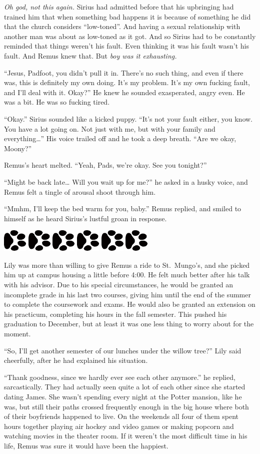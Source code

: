\documentclass[12pt,twoside,openright]{memoir}
\newcommand{\dogPrintRule}{	
	\begin{center}
		\hspace{.5em}
		\includegraphics[angle=60]{dogprint.pdf}
		\hspace{.5em}
		\includegraphics[angle=120]{dogprint.pdf}
		\hspace{.5em}
		\includegraphics[angle=60]{dogprint.pdf}
		\hspace{.5em}
		\includegraphics[angle=120]{dogprint.pdf}
		\hspace{.5em}
		\includegraphics[angle=60]{dogprint.pdf}
		\hspace{.5em}
		\includegraphics[angle=120]{dogprint.pdf}
		\hspace{.5em}
	\end{center}
}
\begin{document}
\textit{Oh god, not this again.} Sirius had admitted before that his upbringing had trained him that when something bad happens it is because of something he did that the church considers ``low-toned''. And having a sexual relationship with another man was about as low-toned as it got. And so Sirius had to be constantly reminded that things weren't his fault. Even thinking it was his fault wasn't his fault. And Remus knew that. But \textit{boy was it exhausting.}

``Jesus, Padfoot, you didn't pull it in. There's no such thing, and even if there was, this is definitely my own doing. It's my problem. It's my own fucking fault, and I'll deal with it. Okay?'' He knew he sounded exasperated, angry even. He was a bit. He was so fucking tired.

``Okay.'' Sirius sounded like a kicked puppy. ``It's not your fault either, you know. You have a lot going on. Not just with me, but with your family and everything…'' His voice trailed off and he took a deep breath. ``Are we okay, Moony?''

Remus's heart melted. ``Yeah, Pads, we're okay. See you tonight?''

``Might be back late… Will you wait up for me?'' he asked in a husky voice, and Remus felt a tingle of arousal shoot through him.

``Mmhm, I'll keep the bed warm for you, baby.'' Remus replied, and smiled to himself as he heard Sirius's lustful groan in response. 

\dogPrintRule 

Lily was more than willing to give Remus a ride to St.\ Mungo's, and she picked him up at campus housing a little before
4:00. He felt much better after his talk with his advisor. Due to his special circumstances, he would be granted an incomplete grade in his last two courses, giving him until the end of the summer to complete the coursework and exams. He would also be granted an extension on his practicum, completing his hours in the fall semester. This pushed his graduation to December, but at least it was one less thing to worry about for the moment. 

``So, I'll get another semester of our lunches under the willow tree?'' Lily said cheerfully, after he had explained his situation.

``Thank goodness, since we hardly ever see each other anymore.'' he replied, sarcastically. They had actually seen quite a lot of each other since she started dating James. She wasn't spending every night at the Potter mansion, like he was, but still their paths crossed frequently enough in the big house where both of their boyfriends happened to live. On the weekends all four of them spent hours together playing air hockey and video games or making popcorn and watching movies in the theater room. If it weren't the most difficult time in his life, Remus was sure it would have been the happiest.
\end{document}
